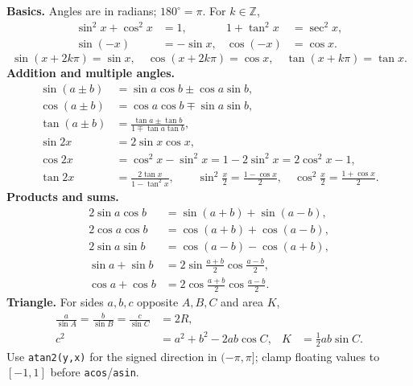 \begingroup\small
\textbf{Basics.} Angles are in radians; $180^\circ=\pi$. For $k\in\mathbb Z$,
\begin{align*}
 \sin^2x+\cos^2x&=1, & 1+\tan^2x&=\sec^2x,\\
 \sin(-x)&=-\sin x, & \cos(-x)&=\cos x.
\end{align*}
\[
 \sin(x+2k\pi)=\sin x,\quad \cos(x+2k\pi)=\cos x,\quad
 \tan(x+k\pi)=\tan x.
\]
\textbf{Addition and multiple angles.}
\begin{align*}
 \sin(a\!\pm\!b)&=\sin a\cos b\pm\cos a\sin b,\\
 \cos(a\!\pm\!b)&=\cos a\cos b\mp\sin a\sin b,\\
 \tan(a\!\pm\!b)&=\frac{\tan a\pm\tan b}{1\mp\tan a\tan b},\\
 \sin 2x&=2\sin x\cos x,\\
 \cos 2x&=\cos^2x-\sin^2x=1-2\sin^2x=2\cos^2x-1,\\
 \tan 2x&=\frac{2\tan x}{1-\tan^2x},\qquad
 \sin^2\frac x2=\frac{1-\cos x}{2},\quad
 \cos^2\frac x2=\frac{1+\cos x}{2}.
\end{align*}
\textbf{Products and sums.}
\begin{align*}
 2\sin a\cos b&=\sin(a+b)+\sin(a-b),\\
 2\cos a\cos b&=\cos(a+b)+\cos(a-b),\\
 2\sin a\sin b&=\cos(a-b)-\cos(a+b),\\
 \sin a+\sin b&=2\sin\frac{a+b}{2}\cos\frac{a-b}{2},\\
 \cos a+\cos b&=2\cos\frac{a+b}{2}\cos\frac{a-b}{2}.
\end{align*}
\textbf{Triangle.} For sides $a,b,c$ opposite $A,B,C$ and area $K$,
\begin{align*}
 \frac a{\sin A}=\frac b{\sin B}=\frac c{\sin C}&=2R,\\
 c^2&=a^2+b^2-2ab\cos C, & K&=\frac12ab\sin C.
\end{align*}
Use \texttt{atan2(y,x)} for the signed direction in $(-\pi,\pi]$; clamp
floating values to $[-1,1]$ before \texttt{acos}/\texttt{asin}.
\endgroup
